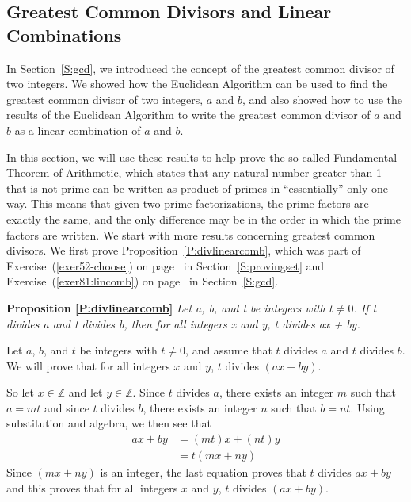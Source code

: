 \subsection*{Greatest Common Divisors and Linear Combinations}
In Section~\ref{S:gcd}, we introduced the concept of the greatest common divisor of two integers.  We showed how the Euclidean Algorithm can be used to find the greatest common divisor of two integers, $a$  and  $b$, and also showed how to use the results of the Euclidean Algorithm to write the greatest common divisor of  $a$  and  $b$  as a linear combination of  $a$ and  $b$.

In this section, we will use these results to help prove the so-called Fundamental Theorem of Arithmetic, which states that any natural number greater than 1 that is not prime can be written as  product of primes in ``essentially'' only one way.  This means that given two prime factorizations, the prime factors are exactly the same, and the only difference may be in the order in which the prime factors are written.  We start with more results concerning greatest common divisors.  We first prove Proposition~\ref{P:divlinearcomb}, which was part of Exercise~(\ref{exer52-choose}) on page~\pageref{exer52-choose} in Section~\ref{S:provingset} and Exercise~(\ref{exer81:lincomb}) on page~\pageref{exer81:lincomb} in Section~\ref{S:gcd}.

\noindent
\textbf{Proposition \ref{P:divlinearcomb}}  \emph{Let a, b, and  t  be integers with $t \ne 0$.  If  t  divides  a  and  t  divides  b, then for all integers  x  and  y,  t  divides  
\text{(}ax + by\text{)}.}

\begin{myproof} Let $a$, $b$, and  $t$  be integers with $t \ne 0$, and assume that $t$  divides  $a$  and  $t$  divides  $b$.  We will prove that for all integers  $x$  and  $y$,  $t$  divides  $(ax + by)$.

So let  $x \in \mathbb{Z}$ and let  $y \in \mathbb{Z}$.  Since  $t$  divides  $a$, there exists an integer  $m$  such that $a = mt$ and since $t$ divides $b$, there exists an integer $n$ such that $b = nt$.  Using substitution and algebra, we then see that
\begin{align*}
ax + by &= (mt)x + (nt)y \\
        &= t(mx + ny)
\end{align*}
Since $(mx + ny)$ is an integer, the last equation proves that $t$ divides $ax + by$ and this proves that for all integers  $x$  and  $y$,  $t$  divides  $(ax + by)$.
\end{myproof}

